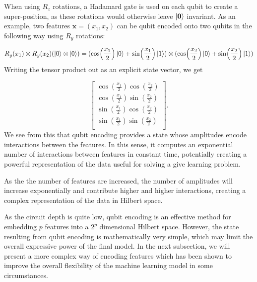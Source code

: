 When using $R_z$ rotations, a Hadamard gate is used on each qubit to create a super-position, as these rotations would otherwise leave $\ket{\boldsymbol{0}}$ invariant. As an example, two features $\boldsymbol{x} = (x_1, x_2)$ can be qubit encoded onto two qubits in the following way using $R_y$ rotations:

\begin{equation}
    R_y(x_1)\otimes R_y(x_2) (\ket{0} \otimes \ket{0}) = 
    (\cos(\frac{x_1}{2})\ket{0} + \sin(\frac{x_1}{2})\ket{1})\otimes
    (\cos(\frac{x_2}{2})\ket{0} + \sin(\frac{x_2}{2})\ket{1})
\end{equation}
Writing the tensor product out as an explicit state vector, we get 

\begin{equation}\label{eq:qubit rotation interaction}
\begin{bmatrix}
    \cos(\frac{x_1}{2})\cos(\frac{x_2}{2}) \\
    \cos(\frac{x_1}{2})\sin(\frac{x_2}{2}) \\
    \sin(\frac{x_1}{2})\cos(\frac{x_2}{2}) \\
    \sin(\frac{x_1}{2})\sin(\frac{x_2}{2}) \\
    \end{bmatrix}.
\end{equation}
We see from this that qubit encoding provides a state whose amplitudes encode interactions between the features. In this sense, it computes an exponential number of interactions between features in constant time, potentially creating a powerful representation of the data useful for solving a give learning problem.

As the the number of features are increased, the number of amplitudes will increase exponentially and contribute higher and higher interactions, creating a complex representation of the data in Hilbert space. 

As the circuit depth is quite low, qubit encoding is an effective method for embedding $p$ features into a $2^p$ dimensional Hilbert space. However, the state resulting from qubit encoding is mathematically very simple, which may limit the overall expressive power of the final model. In the next subsection, we will present a more complex way of encoding features which has been shown to improve the overall flexibility of the machine learning model in some circumstances. 



